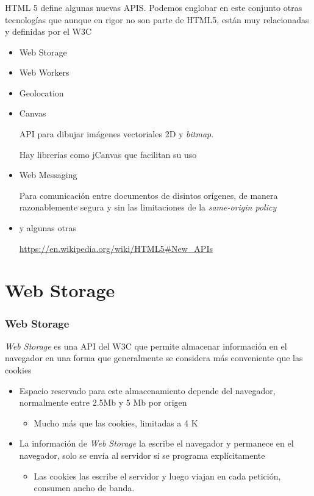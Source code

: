 \documentclass[ucs]{beamer}
\begin{document}
\begin{frame}[fragile]
\frametitle{}
HTML 5 define algunas nuevas APIS. Podemos englobar en este conjunto
otras tecnologías que aunque en rigor no son parte de HTML5,
están muy relacionadas y definidas por el W3C 
\begin{itemize}
\item
Web Storage
\item
Web Workers
\item
Geolocation
\item
Canvas

API para dibujar imágenes vectoriales 2D y 
\emph{bitmap}. 

Hay librerías como jCanvas que facilitan su uso

\item
Web Messaging 

Para comunicación entre documentos de disintos orígenes, de manera
razonablemente segura y sin las limitaciones de la
\emph{same-origin policy}

\item
y algunas otras

\url{https://en.wikipedia.org/wiki/HTML5#New_APIs}
\end{itemize}

\end{frame}




\section{Web Storage}
\begin{frame}[fragile]
\frametitle{Web Storage}


\emph{Web Storage}
 es una API del W3C que permite almacenar información en el navegador 
en una forma que 
generalmente se considera más conveniente que las cookies


\begin{itemize}
\item
Espacio reservado para este almacenamiento depende del navegador, normalmente
entre 2.5Mb y 5 Mb por origen 

    \begin{itemize}
    \item
Mucho más que las cookies, limitadas a 4 K
    \end{itemize}

\item

La información de 
\emph{Web Storage} 
la escribe el navegador y permanece en el navegador, solo se envía al servidor
si se programa explícitamente

    \begin{itemize}
    \item
Las cookies las escribe el servidor y luego viajan en cada petición,
consumen ancho de banda. 
    \end{itemize}
\end{itemize}
\end{frame}
\end{document}
